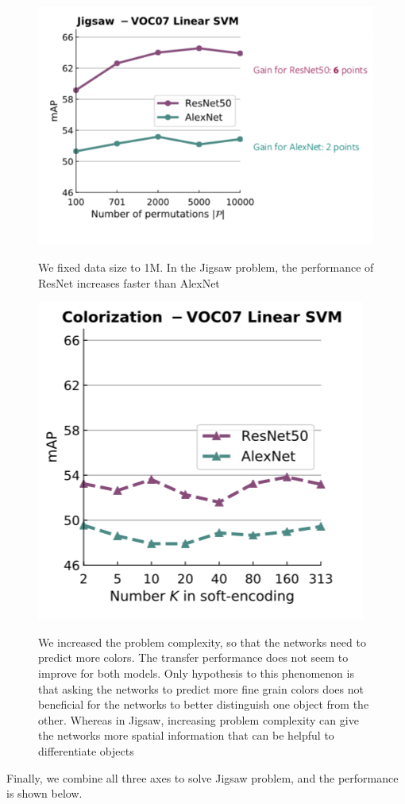 \begin{figure}[H]
\centering
\includegraphics[width=0.8\linewidth]{lectures/13-b/graphics/jigsaw2.png}
\label{fig:jigsaw2}
\caption{We fixed data size to 1M. In the Jigsaw problem, the performance of ResNet increases faster than AlexNet}
\end{figure}

\begin{figure}[H]
\centering
\includegraphics[width=0.6\linewidth]{lectures/13-b/graphics/colorization2.png}
\label{fig:colorization2}
\caption{We increased the problem complexity, so that the networks need to predict more colors. The transfer performance does not seem to improve for both models. Only hypothesis to this phenomenon is that asking the networks to predict more fine grain colors does not beneficial for the networks to better distinguish one object from the other. Whereas in Jigsaw, increasing problem complexity can give the networks more spatial information that can be helpful to differentiate objects}
\end{figure}

Finally, we combine all three axes to solve Jigsaw problem, and the performance  is shown below.

